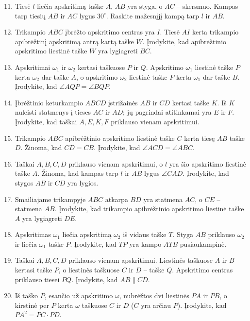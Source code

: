\documentclass[11pt,a4paper]{scrartcl}
\begin{document}
\begin{enumerate}
    \setcounter{enumi}{10}
    \item Tiesė $l$ liečia apskritimą taške $A$, $AB$ yra styga, o $AC$ – skersmuo. Kampas tarp tiesių $AB$ ir $AC$ lygus $30^\circ$. Raskite mažesnįjį kampą tarp $l$ ir $AB$.
    \item Trikampio $ABC$ įbrėžto apskritimo centras yra $I$. Tiesė $AI$ kerta trikampio apibrėžtinį apskritimą antrą kartą taške $W$. Įrodykite, kad apibrėžtinio apskritimo liestinė taške $W$ yra lygiagreti $BC$.
    \item Apskritimai $\omega_1$ ir $\omega_2$ kertasi taškuose $P$ ir $Q$. Apskritimo $\omega_1$ liestinė taške $P$ kerta $\omega_2$ dar taške $A$, o apskritimo $\omega_2$ liestinė taške $P$ kerta $\omega_1$ dar taške $B$. Įrodykite, kad $\angle AQP=\angle BQP$.
    \item Įbrėžtinio keturkampio $ABCD$ įstrižainės $AB$ ir $CD$ kertasi taške $K$. Iš $K$ nuleisti statmenys į tieses $AC$ ir $AD$; jų pagrindai atitinkamai yra $E$ ir $F$. Įrodykite, kad taškai $A,E,K,F$ priklauso vienam apskritimui.
    \item Trikampio $ABC$ apibrėžtinio apskritimo liestinė taške $C$ kerta tiesę $AB$ taške $D$. Žinoma, kad $CD=CB$. Įrodykite, kad $\angle ACD=\angle ABC$.
    \item Taškai $A,B,C,D$ priklauso vienam apskritimui, o $l$ yra šio apskritimo liestinė taške $A$. Žinoma, kad kampas tarp $l$ ir $AB$ lygus $\angle CAD$. Įrodykite, kad stygos $AB$ ir $CD$ yra lygios.
    \item Smailiajame trikampyje $ABC$ atkarpa $BD$ yra statmena $AC$, o $CE$ – statmena $AB$. Įrodykite, kad trikampio apibrėžtinio apskritimo liestinė taške $A$ yra lygiagreti $DE$.
    \item Apskritimas $\omega_1$ liečia apskritimą $\omega_2$ iš vidaus taške $T$. Styga $AB$ priklauso $\omega_2$ ir liečia $\omega_1$ taške $P$. Įrodykite, kad $TP$ yra kampo $ATB$ pusiaukampinė.
    \item Taškai $A,B,C,D$ priklauso vienam apskritimui. Liestinės taškuose $A$ ir $B$ kertasi taške $P$, o liestinės taškuose $C$ ir $D$ – taške $Q$. Apskritimo centras priklauso tiesei $PQ$. Įrodykite, kad $AB\parallel CD$.
    \item Iš taško $P$, esančio už apskritimo $\omega$, nubrėžtos dvi liestinės $PA$ ir $PB$, o kirstinė per $P$ kerta $\omega$ taškuose $C$ ir $D$ ($C$ yra arčiau $P$). Įrodykite, kad $PA^2=PC\cdot PD$.
\end{enumerate}
\end{document}
